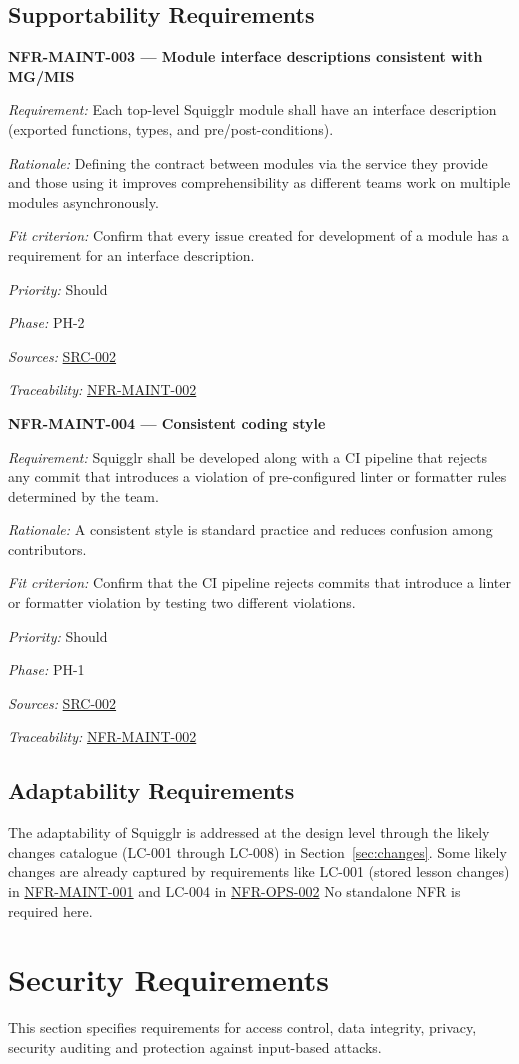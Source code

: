 \documentclass[12pt]{article}
\renewcommand{\_}{\textunderscore\allowbreak}%
\newenvironment{srsrequirement}[2]{%
  \par\medskip\noindent\phantomsection\label{req:#1}%
  \textbf{#1 --- #2}\par\nobreak\smallskip }{\par\medskip}
\newcommand{\reqfield}[2]{\noindent\textit{#1:} #2\par}
\newcommand{\reqshall}[1]{\reqfield{Requirement}{#1}}
\newcommand{\reqrationale}[1]{\reqfield{Rationale}{#1}}
\newcommand{\reqfit}[1]{\reqfield{Fit criterion}{#1}}
\newcommand{\reqpriority}[1]{\reqfield{Priority}{#1}}
\newcommand{\reqphase}[1]{\reqfield{Phase}{#1}}
\newcommand{\reqsources}[1]{\reqfield{Sources}{#1}}
\newcommand{\reqtraces}[1]{\reqfield{Traceability}{#1}}
\newcommand{\reqref}[1]{\hyperref[req:#1]{#1}}
\newcommand{\srcref}[1]{\hyperref[src:#1]{SRC-#1}}
\begin{document}
\subsection{Supportability Requirements}

\begin{srsrequirement}{NFR-MAINT-003}{Module interface descriptions consistent with MG/MIS}
  \reqshall{Each top-level Squigglr module shall have an interface description
(exported functions, types, and pre/post-conditions).} \reqrationale{Defining
the contract between modules via the service they provide and those using it
improves comprehensibility as different teams work on multiple modules
asynchronously.} \reqfit{Confirm that every issue created for development of a
module has a requirement for an interface description.}
  \reqpriority{Should}
  \reqphase{PH-2}
  \reqsources{\srcref{002}} \reqtraces{\reqref{NFR-MAINT-002}}
\end{srsrequirement}

\begin{srsrequirement}{NFR-MAINT-004}{Consistent coding style}
  \reqshall{Squigglr shall be developed along with a CI pipeline that rejects
any commit that introduces a violation of pre-configured linter or formatter
rules determined by the team.} \reqrationale{A consistent style is standard
practice and reduces confusion among contributors.} \reqfit{Confirm that the CI
pipeline rejects commits that introduce a linter or formatter violation by
testing two different violations.}
  \reqpriority{Should}
  \reqphase{PH-1}
  \reqsources{\srcref{002}} \reqtraces{\reqref{NFR-MAINT-002}}
\end{srsrequirement}

\subsection{Adaptability Requirements}

The adaptability of Squigglr is addressed at the design level through the likely
changes catalogue (LC-001 through LC-008) in Section~\ref{sec:changes}. Some
likely changes are already captured by requirements like LC-001 (stored lesson
changes) in \reqref{NFR-MAINT-001} and LC-004 in \reqref{NFR-OPS-002} No
standalone NFR is required here. 

\section{Security Requirements}
This section specifies requirements for access control, data integrity, privacy,
security auditing and protection against input-based attacks.
\end{document}
